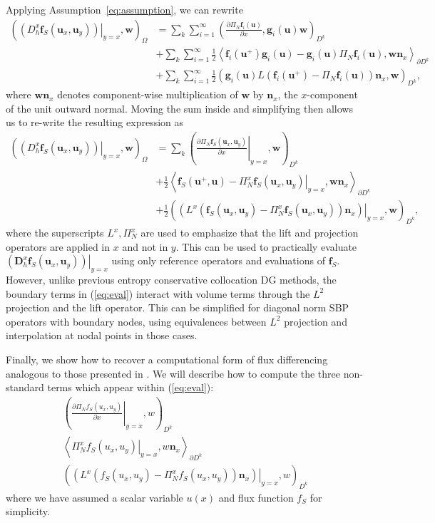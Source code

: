 \documentclass[preprint,10pt]{article}
\theoremstyle{definition}
\theoremstyle{lemma}
\theoremstyle{theorem}
\theoremstyle{assumption}
\newcommand{\pd}[2]{\frac{\partial#1}{\partial#2}}
\newcommand{\LRp}[1]{\left( #1 \right)}
\newcommand{\LRa}[1]{\left\langle #1 \right\rangle}
\begin{document}
Applying Assumption~\ref{eq:assumption}, we can rewrite 
\begin{align*}
\LRp{\left.\LRp{D^x_h \bm{f}_S(\bm{u}_x,\bm{u}_y)}\right|_{y=x},\bm{w}}_{\Omega} &= \sum_k \sum_{i=1}^{\infty} \LRp{\pd{\Pi_N \bm{f}_i(\bm{u})}{x},\bm{g}_i(\bm{u})\bm{w}}_{D^k}\\ 
&+  \sum_k \sum_{i=1}^{\infty}\frac{1}{2}\LRa{\bm{f}_i(\bm{u}^+)\bm{g}_i(\bm{u}) - \bm{g}_i(\bm{u})\Pi_N\bm{f}_i(\bm{u}),\bm{w}\bm{n}_x}_{\partial D^k}\\
&+  \sum_k \sum_{i=1}^{\infty}\frac{1}{2}\LRp{\bm{g}_i(\bm{u})L\LRp{\bm{f}_i(\bm{u}^+) - \Pi_N\bm{f}_i(\bm{u})}\bm{n}_x,\bm{w}}_{D^k},
\end{align*}
where $\bm{w}\bm{n}_x$ denotes component-wise multiplication of $\bm{w}$ by $\bm{n}_x$, the $x$-component of the unit outward normal.  Moving the sum inside and simplifying then allows us to re-write the resulting expression as
\begin{align}
\LRp{\left.\LRp{D^x_h \bm{f}_S(\bm{u}_x,\bm{u}_y)}\right|_{y=x},\bm{w}}_{\Omega} &= \sum_k \LRp{\left.\pd{\Pi_N \bm{f}_S(\bm{u}_x,\bm{u}_y)}{x}\right|_{y=x},\bm{w}}_{D^k}\nonumber\\ 
&+ \frac{1}{2}\LRa{\bm{f}_S(\bm{u}^+,\bm{u}) - \left.\Pi_N^x\bm{f}_S(\bm{u}_x,\bm{u}_y)\right|_{y=x},\bm{w}\bm{n}_x}_{\partial D^k} \label{eq:eval}\\
&+ \frac{1}{2}\LRp{\left.\LRp{L^x\LRp{\bm{f}_S(\bm{u}_x,\bm{u}_y) - \Pi_N^x\bm{f}_S(\bm{u}_x,\bm{u}_y)}\bm{n}_x}\right|_{y=x},\bm{w}}_{D^k},\nonumber
\end{align}
where the superscripts $L^x, \Pi_N^x$ are used to emphasize that the lift and projection operators are applied in $x$ and not in $y$.  
This can be used to practically evaluate $\left.\LRp{\bm{D}^x_h \bm{f}_S(\bm{u}_x,\bm{u}_y)}\right|_{y=x}$ using only reference operators and evaluations of $\bm{f}_S$.  However, unlike previous entropy conservative collocation DG methods, the boundary terms in (\ref{eq:eval}) interact with volume terms through the $L^2$ projection and the lift operator.  This can be simplified for diagonal norm SBP operators with boundary nodes, using equivalences between $L^2$ projection and interpolation at nodal points in those cases.  

Finally, we show how to recover a computational form of flux differencing analogous to those presented in \cite{gassner2016split, chen2017entropy}.  We will describe how to compute the three non-standard terms which appear within (\ref{eq:eval}):
\begin{align}
\LRp{\left.\pd{\Pi_N {f}_S({u}_x,{u}_y)}{x}\right|_{y=x},{w}}_{D^k}\label{eq:voleval}\\
\LRa{\left.\Pi_N^x{f}_S({u}_x,{u}_y)\right|_{y=x},{w}\bm{n}_x}_{\partial D^k}\label{eq:surfeval}\\
\LRp{\left.\LRp{L^x\LRp{{f}_S({u}_x,{u}_y) - \Pi_N^x{f}_S({u}_x,{u}_y)}\bm{n}_x}\right|_{y=x},{w}}_{D^k}\label{eq:volsurfeval}
\end{align}
where we have assumed a scalar variable $u(x)$ and flux function $f_S$ for simplicity.
\end{document}
